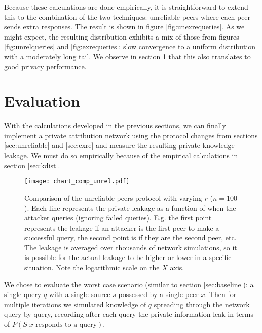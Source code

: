 \documentclass{article}
\newcommand{\secref}[1]{section \ref{sec:#1}}
\newcommand{\figref}[1]{figure \ref{fig:#1}}
\begin{document}
Because these calculations are done empirically, it is straightforward to extend this to
the combination of the two techniques: unreliable peers where each peer sends
extra responses. The result is shown in \figref{unexrequeries}. As we might expect, the
resulting distribution exhibits a mix of those from figures
\ref{fig:unrelqueries} and \ref{fig:exrequeries}: slow convergence to a uniform
distribution with a moderately long tail. We observe in \secref{eval} that this
also translates to good privacy performance.

\section{Evaluation}\label{sec:eval}

With the calculations developed in the previous sections, we can finally
implement a private attribution network using the protocol changes from sections
\ref{sec:unreliable} and \ref{sec:exre} and measure the resulting private
knowledge leakage. We must do so empirically because of the empirical
calculations in \secref{kdist}.

\begin{figure}%
    \centering
	\texttt{[image: chart\_comp\_unrel.pdf]}
	\caption{Comparison of the unreliable peers protocol with varying $r$
	($n=100$). Each line represents the private leakage as a function of when
	the attacker queries (ignoring failed queries). E.g. the first point
	represents the leakage if an attacker is the first peer to make a successful
	query, the second point is if they are the second peer, etc. The leakage is
	averaged over thousands of network simulations, so it is possible for the
	actual leakage to be higher or lower in a specific situation. Note the
	logarithmic scale on the $X$ axis.}
    \label{fig:compunrel}%
\end{figure}

We chose to evaluate the worst case scenario (similar to \secref{baseline}): a
single query $q$ with a single source $s$ possessed by a single peer $x$. Then
for multiple iterations we simulated knowledge of $q$ spreading through the
network query-by-query, recording after each query the private information leak
in terms of $P(S|\text{$x$ responds to a query})$.
\end{document}
